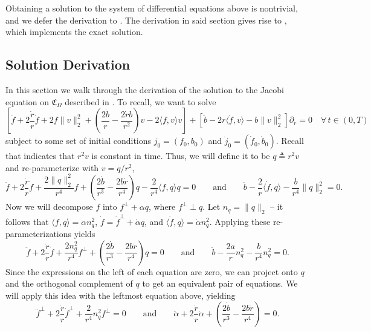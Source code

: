 \documentclass[11pt]{article}
\begin{document}
Obtaining a solution to the system of differential equations above is nontrivial, and we defer the derivation to . The derivation in said section gives rise to , which implements the exact solution. 

\subsection{Solution Derivation}
In this section we walk through the derivation of the solution to the Jacobi equation on $\mathfrak{C}_\Omega$ described in . To recall, we want to solve
\[\left[\ddot f + 2\frac{\dot r}{r}\dot f + 2f\|v\|_2^2  + \left(\frac{2\dot b}{r} - \frac{2 \dot rb}{r^2}\right)v - 2\langle f,v\rangle v\right] + \left[\ddot b - 2r\langle \dot f, v\rangle - b\|v\|_2^2\right]\partial_r = 0 \quad \forall \,t \in (0, T)\]
subject to some set of initial conditions $j_0 = (f_0, b_0)$ and $\dot j_0 = (\dot f_0, \dot b_0)$. Recall that  indicates that $r^2v$ is constant in time. Thus, we will define it to be $q \triangleq r^2v$ and re-parameterize with $v = q/r^2$, 
\begin{equation*}
    \ddot f +  2\frac{\dot r}{r}\dot f +\frac{2\|q\|_2^2}{r^4}f + \left(\frac{2\dot b}{r^3} - \frac{ 2b\dot r}{r^4}\right)q - \frac{2}{r^4}\langle f, q\rangle q = 0 \qquad \text{and} \qquad \ddot b - \frac{2}{r}\langle \dot f, q\rangle - \frac{b}{r^4} \|q\|_2^2 = 0.
\end{equation*}
Now we will decompose $f$ into $f^{\perp} + \alpha q$, where $f^{\perp} \perp q$. Let $n_q = \|q\|_2$ -- it follows that $\langle f, q\rangle = \alpha n_q^2$, $\dot f = \dot f^{\perp} + \dot \alpha q$, and $\langle \dot f, q\rangle = \dot \alpha n_q^2$. Applying these re-parameterizations yields
\begin{equation*}
    \ddot f +  2\frac{\dot r}{r}\dot f + \frac{2n_q^2}{r^4}f^\perp  + \left(\frac{2\dot b}{r^3} - \frac{ 2b\dot r}{r^4}\right)q  = 0 \qquad \text{and} \qquad \ddot b - \frac{2\dot a}{r}n_q^2 - \frac{b}{r^4} n_q^2 = 0.
\end{equation*}
Since the expressions on the left of each equation are zero, we can project onto $q$ and the orthogonal complement of $q$ to get an equivalent pair of equations. We will apply this idea with the leftmost equation above, yielding
\begin{equation*}
    \ddot f^{\perp} +  2\frac{\dot r}{r}\dot f^{\perp} +\frac{2}{r^4}n_q^2f^{\perp} = 0 \qquad \text{and} \qquad \ddot \alpha +  2\frac{\dot r}{r}\dot \alpha + \left(\frac{2\dot b}{r^3} - \frac{ 2b\dot r}{r^4}\right)  = 0.
\end{equation*}
\end{document}
